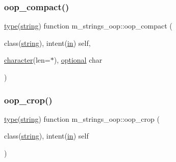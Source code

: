 \subsubsection{\texorpdfstring{oop\+\_\+compact()}{oop\_compact()}}
{\footnotesize\ttfamily \hyperlink{stop__watch_83_8txt_a70f0ead91c32e25323c03265aa302c1c}{type}(\hyperlink{structm__strings__oop_1_1string}{string}) function m\+\_\+strings\+\_\+oop\+::oop\+\_\+compact (\begin{DoxyParamCaption}\item[{class(\hyperlink{structm__strings__oop_1_1string}{string}), intent(\hyperlink{M__journal_83_8txt_afce72651d1eed785a2132bee863b2f38}{in})}]{self,  }\item[{\hyperlink{option__stopwatch_83_8txt_abd4b21fbbd175834027b5224bfe97e66}{character}(len=$\ast$), \hyperlink{option__stopwatch_83_8txt_aa4ece75e7acf58a4843f70fe18c3ade5}{optional}}]{char }\end{DoxyParamCaption})\hspace{0.3cm}{\ttfamily [private]}}

\mbox{\label{namespacem__strings__oop_aa1a395d359592720a842054fd0aaff0a}} 
\subsubsection{\texorpdfstring{oop\+\_\+crop()}{oop\_crop()}}
{\footnotesize\ttfamily \hyperlink{stop__watch_83_8txt_a70f0ead91c32e25323c03265aa302c1c}{type}(\hyperlink{structm__strings__oop_1_1string}{string}) function m\+\_\+strings\+\_\+oop\+::oop\+\_\+crop (\begin{DoxyParamCaption}\item[{class(\hyperlink{structm__strings__oop_1_1string}{string}), intent(\hyperlink{M__journal_83_8txt_afce72651d1eed785a2132bee863b2f38}{in})}]{self }\end{DoxyParamCaption})\hspace{0.3cm}{\ttfamily [private]}}

\mbox{\label{namespacem__strings__oop_aa6eaf2b8a12a905d0ebaa21a84871dec}} 
